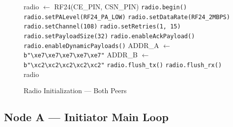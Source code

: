 \documentclass[11pt,a4paper]{article}
\begin{document}
\begin{figure}[htbp]
\begin{algorithm}[H]
\SetAlgoLined
{}
radio $\leftarrow$ RF24(CE\_PIN, CSN\_PIN)\;
\texttt{radio.begin()}\;
\texttt{radio.setPALevel(RF24\_PA\_LOW)} 
\texttt{radio.setDataRate(RF24\_2MBPS)} 
\texttt{radio.setChannel(108)} 
\texttt{radio.setRetries(1, 15)} 
\texttt{radio.setPayloadSize(32)}\;
\texttt{radio.enableAckPayload()}\;
\texttt{radio.enableDynamicPayloads()}\;
ADDR\_A $\leftarrow$ \texttt{b"\textbackslash xe7\textbackslash xe7\textbackslash xe7\textbackslash xe7\textbackslash xe7"}\;
ADDR\_B $\leftarrow$ \texttt{b"\textbackslash xc2\textbackslash xc2\textbackslash xc2\textbackslash xc2\textbackslash xc2"}\;
\texttt{radio.flush\_tx()}\;
\texttt{radio.flush\_rx()}\;
\Return radio\;
\caption{Radio Initialization --- Both Peers}
\label{alg:radio-init}
\end{algorithm}
\end{figure}

\subsection{Node A --- Initiator Main Loop}
\end{document}
